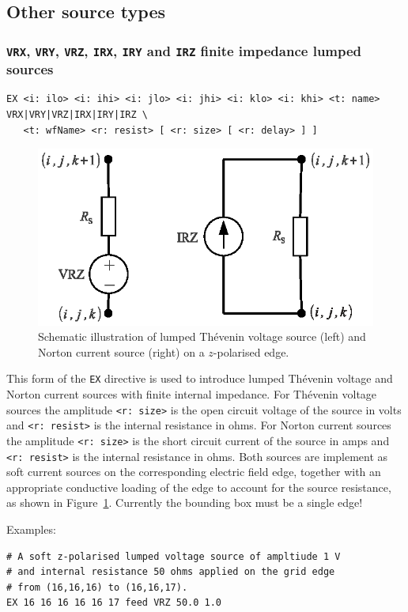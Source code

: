 \documentclass[onecolumn,a4paper]{article}
\numberwithin{equation}{section}
\begin{document}
\subsection{Other source types}

\subsubsection{\texttt{VRX}, \texttt{VRY}, \texttt{VRZ}, \texttt{IRX}, \texttt{IRY} and \texttt{IRZ} finite impedance lumped sources}

\begin{verbatim}
EX <i: ilo> <i: ihi> <i: jlo> <i: jhi> <i: klo> <i: khi> <t: name> VRX|VRY|VRZ|IRX|IRY|IRZ \
   <t: wfName> <r: resist> [ <r: size> [ <r: delay> ] ]
\end{verbatim}

\begin{figure}[ht]
  \begin{center}
   \includegraphics[width=0.4\linewidth]{figures/lumped_src}
  \end{center}
  \vspace{-5mm}
  \caption{\label{fg:lumped_src}Schematic illustration of lumped Th{\'e}venin voltage source (left)
  and Norton current source (right) on a $z$-polarised edge.}
\end{figure}

This form of the \texttt{EX} directive is used to introduce lumped Th{\'e}venin voltage and
Norton current sources with finite internal impedance. For Th{\'e}venin voltage sources
the amplitude \texttt{<r:~size>} is the open circuit voltage of the source in volts and
\texttt{<r:~resist>} is the internal resistance in ohms. For Norton current sources
the amplitude \texttt{<r:~size>} is the short circuit current of the source in amps and
\texttt{<r:~resist>} is the internal resistance in ohms. Both sources are implement as soft 
current sources on the corresponding electric field edge, together with an appropriate
conductive loading of the edge to account for the source resistance, as shown in Figure~\ref{fg:lumped_src}.
Currently the bounding box must be a single edge!

Examples:
\begin{verbatim}
# A soft z-polarised lumped voltage source of ampltiude 1 V
# and internal resistance 50 ohms applied on the grid edge 
# from (16,16,16) to (16,16,17).
EX 16 16 16 16 16 17 feed VRZ 50.0 1.0
\end{verbatim}
\end{document}
